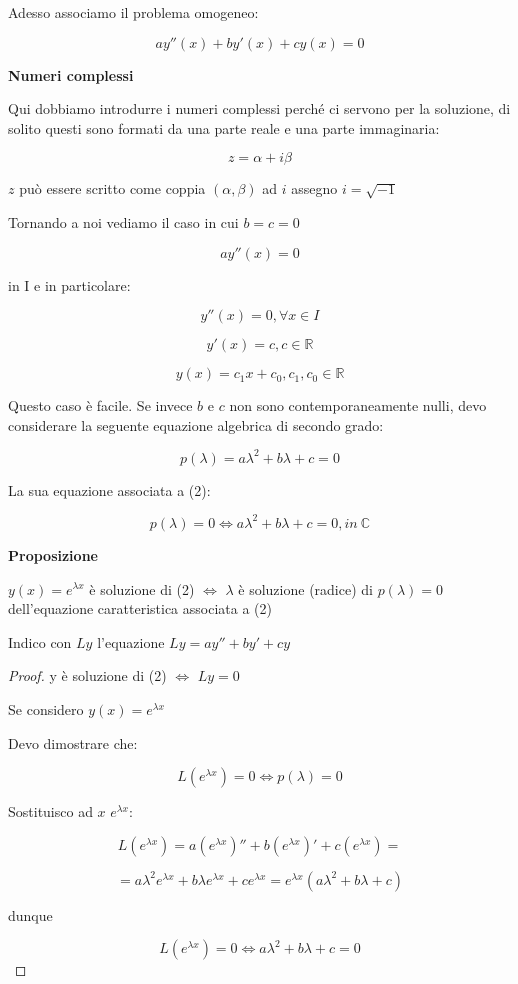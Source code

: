 \documentclass[11pt]{article}
\begin{document}
Adesso associamo il problema omogeneo:

\[
    ay''(x) + by'(x) + cy(x) = 0
\]

\textbf{Numeri complessi} 

Qui dobbiamo introdurre i numeri complessi perché ci servono per la soluzione, di solito questi sono formati da una parte reale e una parte immaginaria:

\[
    z = \alpha + i\beta
\]

$z$ può essere scritto come coppia $(\alpha,\beta)$ ad $i$ assegno $i=\sqrt{-1}$

Tornando a noi vediamo il caso in cui $b=c=0$

\[
    ay''(x) = 0
\]

in I e in particolare:

\[
    y''(x) = 0, \forall x \in I
\]

\[
    y'(x) = c, c \in \mathbb{R}
\]

\[
    y(x) = c_1x+c_0,c_1,c_0 \in \mathbb{R}
\]

Questo caso è facile. Se invece $b$ e $c$ non sono contemporaneamente nulli, devo considerare la seguente equazione algebrica di secondo grado:

\[
    p(\lambda) = a \lambda^{2}+b \lambda + c =0
\]

La sua equazione associata a (2):

\[
    p(\lambda) =0 \Leftrightarrow  a \lambda^{2}+b \lambda + c =0, in\ \mathbb{C}
\]



\textbf{Proposizione} 

$y(x) = e ^{\lambda x}$ è soluzione di (2) $\Leftrightarrow $ $\lambda$ è soluzione (radice) di $p(\lambda)=0$ dell'equazione caratteristica associata a (2)

Indico con $Ly$ l'equazione $Ly= ay''+by'+cy$

\begin{proof}
    y è soluzione di (2) $\Leftrightarrow$ $Ly=0$ 

    Se considero $y(x) = e ^{\lambda x}$ 

    Devo dimostrare che:

    \[
        L(e ^{\lambda x}) = 0 \Leftrightarrow  p(\lambda) = 0
    \]

    Sostituisco ad $x$ $e ^{\lambda x}$:

    \[
        L(e ^{\lambda x}) = a( e^{\lambda x})'' + b( e ^{\lambda x})' + c(e ^{\lambda x}) =
    \]

    \[
        =a \lambda ^{2} e ^{\lambda x} + b \lambda e ^{\lambda x} + c e^{\lambda x}= e ^{\lambda x}(a \lambda ^{2}+ b \lambda+ c)
    \]

    dunque

    \[
        L( e ^{\lambda x}) = 0 \Leftrightarrow a \lambda ^{2}+ b \lambda +c = 0 
    \]
           
\end{proof}
\end{document}

